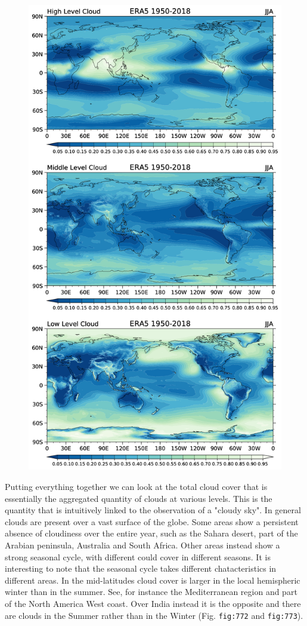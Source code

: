 \begin{figure}
\centering
\includegraphics[width = .7 \textwidth]{figs/GD/CloudsLevelJJA.png}
\caption{} \label{fig:}
\end{figure}

Putting everything together we can look at the total cloud cover that is
essentially the aggregated quantity of clouds at various levels. This is
the quantity that is intuitively linked to the observation of a "cloudy
sky". In general clouds are present over a vast surface of the globe.
Some areas show a persistent absence of cloudiness over the entire year,
such as the Sahara desert, part of the Arabian peninsula, Australia and
South Africa. Other areas instead show a strong seasonal cycle, with
different could cover in different seasons. It is interesting to note
that the seasonal cycle takes different chatacteristics in different
areas. In the mid-latitudes cloud cover is larger in the local
hemispheric winter than in the summer. See, for instance the
Mediterranean region and part of the North America West coast. Over
India instead it is the opposite and there are clouds in the Summer
rather than in the Winter (Fig. \texttt{fig:772} and \texttt{fig:773}).

